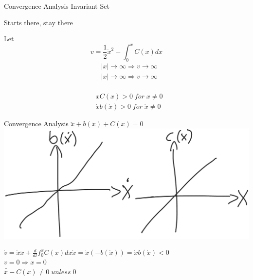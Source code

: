 \documentclass{beamer}
\begin{document}
\begin{frame}{Convergence Analysis}
Invariant Set\\
\begin{center}
Starts there, stay there\\
\end{center}
Let
$$v=\frac{1}{2}\dot{x}^2+\int_0^x C(x)dx$$
\vspace{-1cm}
\begin{align*}
    &|x| \rightarrow \infty \Rightarrow v \rightarrow \infty\\
    &|x| \rightarrow \infty \Rightarrow v \rightarrow \infty\\
\end{align*}

\begin{align*}
    &xC(x)>0\; for\; x \neq 0\\
    &\dot{x}b(\dot{x}) > 0\; for\; \dot{x} \neq 0
\end{align*}
\end{frame}

\begin{frame}{Convergence Analysis}
    $\ddot{x}+b(\dot{x})+C(x)=0$\\
    \includegraphics[width=\textwidth]{fig/bxcx.png}   

    $\dot{v}=\dot{x}\ddot{x} + \frac{d}{dt}f^x_0 C(x)dx \dot{x} = \dot{x}(-b(\dot{x}))=\dot{x}b(\dot{x})<0$\\
    $v=0 \Rightarrow \dot{x}=0$\\
    $\bar{\ddot{x}}-C(x) \neq 0\; unless\; 0$\\
\end{frame}
\end{document}
